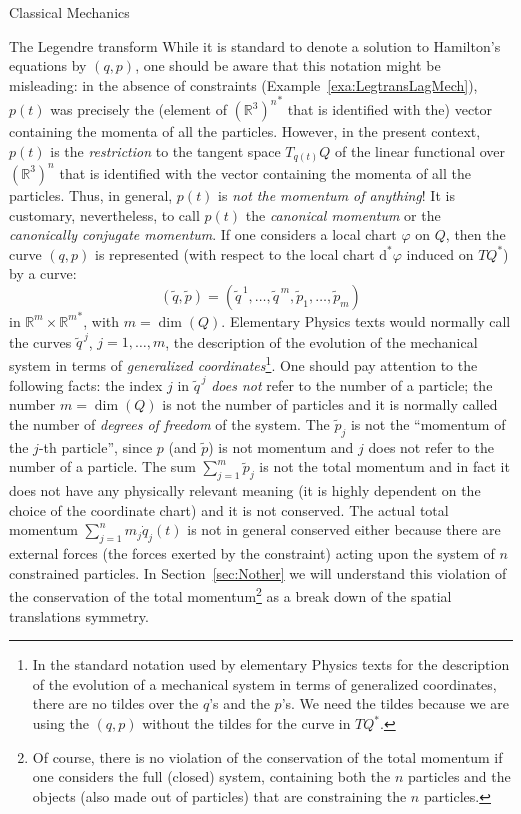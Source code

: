\documentclass[oneside,a4paper,11pt]{amsbook}
\newcommand{\R}{\mathds R}
\newcommand{\dd}{\mathrm d}
\DeclareMathOperator{\Dim}{dim}
\theoremstyle{remark}\newtheorem{exercise}{Exercise}[chapter]
\theoremstyle{plain}\newtheorem{teo}{Theorem}[section]
\theoremstyle{plain}\newtheorem{lem}[teo]{Lemma}
\theoremstyle{plain}\newtheorem{prop}[teo]{Proposition}
\theoremstyle{plain}\newtheorem{cor}[teo]{Corollary}
\theoremstyle{definition}\newtheorem{defin}[teo]{Definition}
\theoremstyle{remark}\newtheorem{rem}[teo]{Remark}
\theoremstyle{definition}\newtheorem{notation}[teo]{Notation}
\theoremstyle{definition}\newtheorem{convention}[teo]{Convention}
\theoremstyle{definition}\newtheorem{example}[teo]{Example}
\numberwithin{section}{chapter}
\numberwithin{equation}{section}
\begin{document}
\begin{chapter}{Classical Mechanics}
\begin{section}{The Legendre transform}
While it is standard to denote a solution to Hamilton's equations
by $(q,p)$, one should be aware that this notation might be misleading: in the absence of constraints (Example~\ref{exa:LegtransLagMech}), $p(t)$ was precisely the
(element of ${(\R^3)^n}^*$ that is identified with the) vector containing the momenta of all the particles. However, in the present context, $p(t)$
is the {\em restriction\/} to the tangent space $T_{q(t)}Q$ of the linear functional over $(\R^3)^n$ that is identified with the vector containing the
momenta of all the particles. Thus, in general, $p(t)$ is {\em not the momentum of anything\/}! It is customary, nevertheless, to call $p(t)$ the
{\em canonical momentum\/} or the {\em canonically conjugate momentum}. If one considers a local chart $\varphi$ on $Q$, then the
curve $(q,p)$ is represented (with respect to the local chart $\dd^*\varphi$ induced on $TQ^*$) by a curve:
\[(\tilde q,\tilde p)=(\tilde q^{\,1},\ldots,\tilde q^{\,m},\tilde p_1,\ldots,\tilde p_m)\]
in $\R^m\times{\R^m}^*$, with $m=\Dim(Q)$. Elementary Physics texts would normally call the curves $\tilde q^{\,j}$, $j=1,\ldots,m$, the description of the
evolution of the mechanical system in terms of {\em generalized coordinates}\footnote{%
In the standard notation used by elementary Physics texts for the description of the evolution of a mechanical system
in terms of generalized coordinates, there are no tildes over the $q$'s and the $p$'s. We need the tildes because we are using the $(q,p)$ without
the tildes for the curve in $TQ^*$.}.
One should pay attention to the following facts: the index $j$ in $\tilde q^{\,j}$
{\em does not\/} refer to the number of a particle; the number $m=\Dim(Q)$ is not the number of particles and
it is normally called the number of {\em degrees of freedom} of the system. The $\tilde p_j$ is not the ``momentum of the $j$-th particle'', since $p$ (and
$\tilde p$) is not momentum and $j$ does not refer to the number of a particle. The sum $\sum_{j=1}^m\tilde p_j$ is not the total momentum and in fact it
does not have any physically relevant meaning
(it is highly dependent on the choice of the coordinate chart) and it is not conserved. The actual total momentum $\sum_{j=1}^nm_j\dot q_j(t)$ is
not in general conserved either because there are external forces (the forces exerted by the constraint) acting upon the system of $n$ constrained particles.
In Section~\ref{sec:Nother} we will understand this violation of the conservation of the total momentum\footnote{%
Of course, there is no violation of the conservation of the total momentum if one considers the full (closed) system,
containing both the $n$ particles and the objects (also made out of particles) that are constraining the $n$ particles.}
as a break down of the spatial translations symmetry.


\end{section}
\end{chapter}
\end{document}
